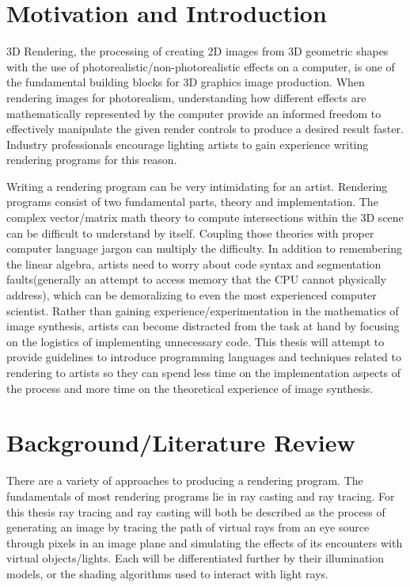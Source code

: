 \documentclass{article}
\begin{document}
\section{Motivation and Introduction}
3D Rendering, the processing of creating 2D images from 3D geometric shapes with the use of photorealistic/non-photorealistic effects on a computer, is one of the fundamental building blocks for 3D graphics image production.  When rendering images for photorealism, understanding how different effects are mathematically represented by the computer provide an informed freedom to effectively manipulate the given render controls to produce a desired result faster.  Industry professionals encourage lighting artists to gain experience writing rendering programs for this reason.

Writing a rendering program can be very intimidating for an artist. Rendering programs consist of two fundamental parts, theory and implementation.  The complex vector/matrix math theory to compute intersections within the 3D scene can be difficult to understand by itself.  Coupling those theories with proper computer language jargon can multiply the difficulty.  In addition to remembering the linear algebra, artists need to worry about code syntax and segmentation faults(generally an attempt to access memory that the CPU cannot physically address), which can be demoralizing to even the most experienced computer scientist.  Rather than gaining experience/experimentation in the mathematics of image synthesis, artists can become distracted from the task at hand by focusing on the logistics of implementing unnecessary code.  This thesis will attempt to provide guidelines to introduce programming languages and techniques related to rendering to artists so they can spend less time on the implementation aspects of the process and more time on the theoretical experience of image synthesis.



\section{Background/Literature Review}
There are a variety of approaches to producing a rendering program.  The fundamentals of most rendering programs lie in ray casting and ray tracing.  For this thesis ray tracing and ray casting will both be described as the process of generating an image by tracing the path of virtual rays from an eye source through pixels in an image plane and simulating the effects of its encounters with virtual objects/lights. Each will be differentiated further by their illumination models, or the shading algorithms used to interact with light rays. 
\end{document}
